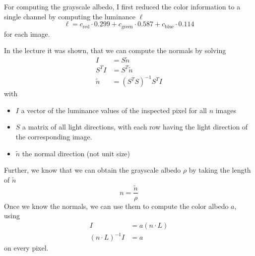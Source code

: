 \documentclass{paper}
\begin{document}
For computing the grayscale albedo, I first reduced the color information to a single channel by computing the luminance $\ell$
\begin{equation}
	\ell = c_\text{red} \cdot 0.299 + 
		c_\text{green} \cdot 0.587 + 
		c_\text{blue} \cdot 0.114
\end{equation}
for each image. 

In the lecture it was shown, that we can compute the normals by solving
\begin{align*}
	 I &= S\tilde{n} \\
	 S^TI &= S^T\tilde{n} \\
	 \tilde{n} &= (S^TS)^{-1}S^TI
\end{align*}
with 
\begin{itemize}
	\item $I$ a vector of the luminance values of the 
	inspected pixel for all $n$ images
	\item $S$ a matrix of all light directions, with each row
	having the light direction of the corresponding image.
	\item $\tilde{n}$ the normal direction (not unit size)
	
\end{itemize}
Further, we know that we can obtain the grayscale albedo $\rho$ by taking the length of $\tilde{n}$
\begin{equation}
	n = \frac{\tilde{n}}{\rho}
\end{equation}
Once we know the normals, we can use them to compute the color albedo $a$, using
\begin{align*}
	I &= a(n \cdot L) \\
	(n \cdot L)^{-1} I &= a
\end{align*}
on every pixel.
\end{document}
